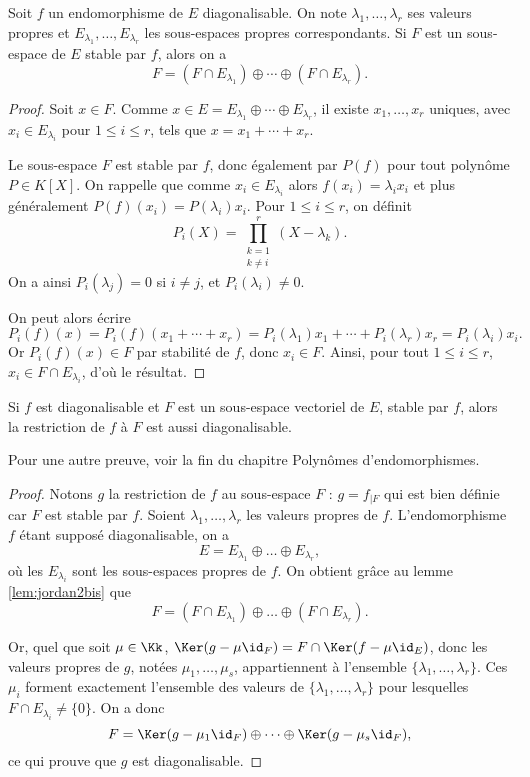 \documentclass[12pt, class=report,crop=false]{standalone}
\begin{document}
\begin{lemme}
\label{lem:jordan2bis}
Soit $f$ un endomorphisme de $E$ diagonalisable. On note $\lambda_1,\ldots,\lambda_r$ ses valeurs propres 
et $E_{\lambda_1},\ldots,E_{\lambda_r}$ les sous-espaces propres correspondants. 
Si $F$ est un sous-espace de $E$ stable par $f$, alors on a 
$$F = (F\cap E_{\lambda_1})\oplus\cdots\oplus (F\cap E_{\lambda_r}).$$
\end{lemme} 

\begin{proof}
Soit $x\in F$. Comme $x\in E=E_{\lambda_1}\oplus\cdots\oplus E_{\lambda_r}$, il existe $x_1,\dots,x_r$ uniques, avec $x_i\in E_{\lambda_i}$ pour $1\leq i\leq r$, tels que $x=x_1+\cdots+x_r$.

Le sous-espace $F$ est stable par $f$, donc également par $P(f)$ pour tout polynôme $P\in K[X]$. 
On rappelle que comme $x_i \in E_{\lambda_i}$ alors $f(x_i)=\lambda_i x_i$ et plus généralement $P(f)(x_i) = P(\lambda_i) x_i$.
Pour $1\leq i\leq r$, on définit
$$P_i(X)=\prod_{\substack{k=1\\k\neq i}}^r(X-\lambda_k).$$
On a ainsi $P_i(\lambda_j)=0$ si $i\neq j$, et $P_i(\lambda_i)\neq 0$. 

On peut alors écrire
$$P_i(f)(x)
= P_i(f)(x_1+\cdots+x_r)
= P_i(\lambda_1)x_1+\cdots+P_i(\lambda_r)x_r
= P_i(\lambda_i)x_i.$$
Or $P_i(f)(x)\in F$ par stabilité de $f$, donc $x_i\in F$. Ainsi, pour tout $1\le i \le r$, $x_i\in F\cap E_{\lambda_i}$, d'où le résultat.
\end{proof}


\begin{lemme}
\label{lem:jordan2}
Si $f$ est diagonalisable et $F$ est un sous-espace vectoriel de $E$, stable par $f$, alors la restriction 
de $f$ à $F$ est aussi diagonalisable.
\end{lemme}

Pour une autre preuve, voir la fin du chapitre \og{}Polynômes d'endomorphismes\fg{}.

\begin{proof}
Notons $g$ la restriction de $f$ au sous-espace $F$ : $g=f_{|F}$ qui est bien définie car $F$ est stable par $f$. Soient $\lambda_1,\dots,\lambda_r$ les valeurs propres de $f$. 
L'endomorphisme $f$ étant supposé diagonalisable, on a 
$$E=E_{\lambda_1}\oplus\dots\oplus E_{\lambda_r},$$
où les $E_{\lambda_i}$ sont les sous-espaces propres de $f$. 
On obtient grâce au lemme \ref{lem:jordan2bis} que
$$F = (F\cap E_{\lambda_1})\oplus\dots\oplus (F\cap E_{\lambda_r}).$$

Or, quel que soit $\mu\in\Kk$, $\Ker(g-\mu\id_F)=F\cap\Ker(f-\mu\id_E)$,
donc les valeurs propres de $g$, notées $\mu_1,\dots,\mu_s$, appartiennent à l'ensemble 
$\{\lambda_1,\dots,\lambda_r\}$. 
Ces $\mu_i$ forment exactement l'ensemble des valeurs de $\{\lambda_1,\dots,\lambda_r\}$ pour lesquelles $F\cap E_{\lambda_i} \neq \{0\}$.
On a donc 
$$F= \Ker(g-\mu_1\id_F)\oplus \cdots \oplus \Ker(g-\mu_s\id_F),$$
ce qui prouve que $g$ est diagonalisable.
\end{proof}
\end{document}
